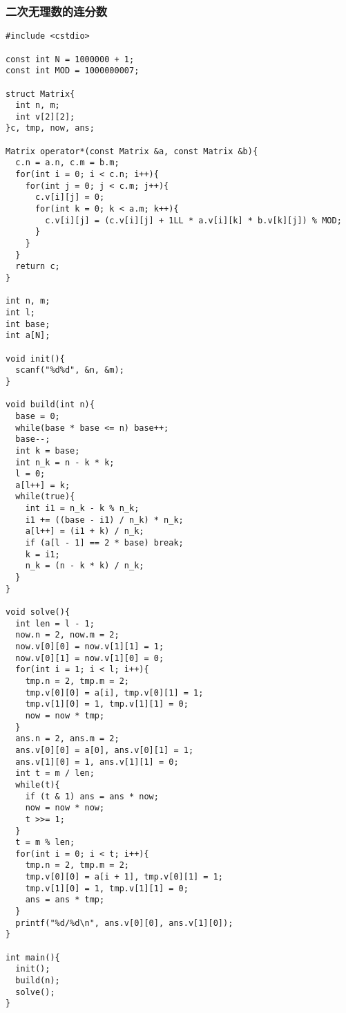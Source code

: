 \subsubsection{二次无理数的连分数}
\begin{verbatim}
#include <cstdio>

const int N = 1000000 + 1;
const int MOD = 1000000007;

struct Matrix{
  int n, m;
  int v[2][2];
}c, tmp, now, ans;

Matrix operator*(const Matrix &a, const Matrix &b){
  c.n = a.n, c.m = b.m;
  for(int i = 0; i < c.n; i++){
    for(int j = 0; j < c.m; j++){
      c.v[i][j] = 0;
      for(int k = 0; k < a.m; k++){
        c.v[i][j] = (c.v[i][j] + 1LL * a.v[i][k] * b.v[k][j]) % MOD;
      }
    }
  }
  return c;
}

int n, m;
int l;
int base;
int a[N];

void init(){
  scanf("%d%d", &n, &m);
}

void build(int n){
  base = 0;
  while(base * base <= n) base++;
  base--;
  int k = base;
  int n_k = n - k * k;
  l = 0;
  a[l++] = k;
  while(true){
    int i1 = n_k - k % n_k;
    i1 += ((base - i1) / n_k) * n_k;
    a[l++] = (i1 + k) / n_k;
    if (a[l - 1] == 2 * base) break;
    k = i1;
    n_k = (n - k * k) / n_k;
  }
}

void solve(){
  int len = l - 1;
  now.n = 2, now.m = 2;
  now.v[0][0] = now.v[1][1] = 1;
  now.v[0][1] = now.v[1][0] = 0;
  for(int i = 1; i < l; i++){
    tmp.n = 2, tmp.m = 2;
    tmp.v[0][0] = a[i], tmp.v[0][1] = 1;
    tmp.v[1][0] = 1, tmp.v[1][1] = 0;
    now = now * tmp;
  }
  ans.n = 2, ans.m = 2;
  ans.v[0][0] = a[0], ans.v[0][1] = 1;
  ans.v[1][0] = 1, ans.v[1][1] = 0;
  int t = m / len;
  while(t){
    if (t & 1) ans = ans * now;
    now = now * now;
    t >>= 1;
  }
  t = m % len;
  for(int i = 0; i < t; i++){
    tmp.n = 2, tmp.m = 2;
    tmp.v[0][0] = a[i + 1], tmp.v[0][1] = 1;
    tmp.v[1][0] = 1, tmp.v[1][1] = 0;
    ans = ans * tmp;
  }
  printf("%d/%d\n", ans.v[0][0], ans.v[1][0]);
}

int main(){
  init();
  build(n);
  solve();
}
\end{verbatim}
